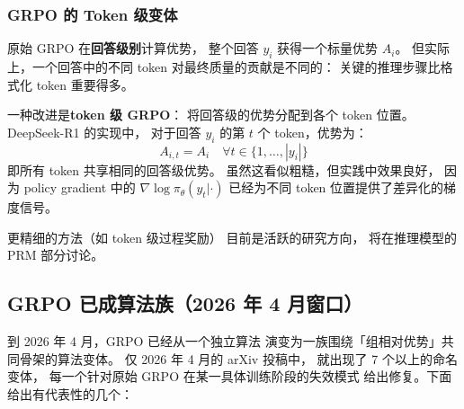 \subsubsection{GRPO 的 Token 级变体}

原始 GRPO 在\textbf{回答级别}计算优势，
整个回答 $y_i$ 获得一个标量优势 $A_i$。
但实际上，一个回答中的不同 token
对最终质量的贡献是不同的：
关键的推理步骤比格式化 token 重要得多。

一种改进是\textbf{token 级 GRPO}：
将回答级的优势分配到各个 token 位置。
DeepSeek-R1 的实现中，
对于回答 $y_i$ 的第 $t$ 个 token，优势为：
\begin{equation}
  A_{i,t} = A_i \quad \forall t \in \{1, \ldots, |y_i|\}
\end{equation}
即所有 token 共享相同的回答级优势。
虽然这看似粗糙，但实践中效果良好，
因为 policy gradient 中的 $\nabla \log \pi_\theta(y_t | \cdot)$
已经为不同 token 位置提供了差异化的梯度信号。

更精细的方法（如 token 级过程奖励）
目前是活跃的研究方向，
将在推理模型的 PRM 部分讨论。

\subsection{GRPO 已成算法族（2026 年 4 月窗口）}
\label{sec:grpo-family}

到 2026 年 4 月，GRPO 已经从一个独立算法
演变为一族围绕「组相对优势」共同骨架的算法变体。
仅 2026 年 4 月的 arXiv 投稿中，
就出现了 7 个以上的命名变体，
每一个针对原始 GRPO 在某一具体训练阶段的失效模式
给出修复。下面给出有代表性的几个：

